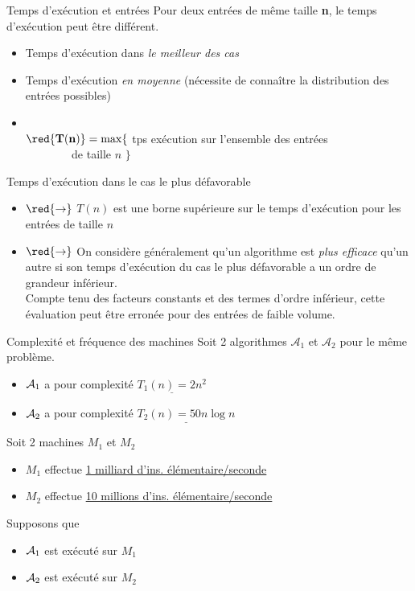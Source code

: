 \begin{frame}{Temps d'exécution et entrées}
  Pour deux entrées de même taille \textbf{n}, le temps d'exécution peut être différent. 
  \begin{itemize}
  \item Temps d'exécution dans \emph{le meilleur des cas}
  \item Temps d'exécution \emph{en moyenne} (nécessite de connaître la distribution des entrées possibles)
  \item {}\\
    $\red{\mathbf{T(n)}}= \max\{$ tps exécution sur l'ensemble des entrées \\ $~~~~~~~~~~~~~~~~~$ de taille $n$ $\}$
  \end{itemize}
\end{frame}

\begin{frame}{Temps d'exécution dans le cas le plus défavorable}
\begin{itemize}
\item[] $\mathbf{\red{\rightarrow}}$ $T(n)$ est une borne supérieure sur le temps d'exécution pour les entrées de taille $n$
\item[] $\mathbf{\red{\rightarrow}}$ On considère généralement qu'un algorithme est  \emph{plus efficace} qu'un autre  si son temps d'exécution du cas le plus défavorable a un ordre de grandeur inférieur. \\
Compte tenu des facteurs constants et des termes d'ordre inférieur, cette évaluation peut être erronée pour des entrées de faible volume.
\end{itemize}
\end{frame}

\begin{frame}{Complexité et fréquence des machines}
  Soit 2 algorithmes $\mathcal{A}_1$ et $\mathcal{A}_2$ pour le même problème. 
  \begin{itemize}
  \item $\mathcal{A}_1$ a pour complexité $\underline{T_1(n) = 2n^2}$
  \item $\mathcal{A}_2$ a pour complexité $\underline{T_2(n) = 50 n\log{}n}$
  \end{itemize}
Soit 2 machines $M_1$ et $M_2$
\begin{itemize}
\item $M_1$ effectue \underline{1 milliard d'ins. élémentaire/seconde}
\item $M_2$ effectue \underline{10 millions d'ins. élémentaire/seconde}
\end{itemize}
Supposons que 
\begin{itemize}
\item $\mathcal{A}_1$ est exécuté sur $M_1$
\item $\mathcal{A}_2$ est exécuté sur $M_2$
\end{itemize}
\end{frame}

